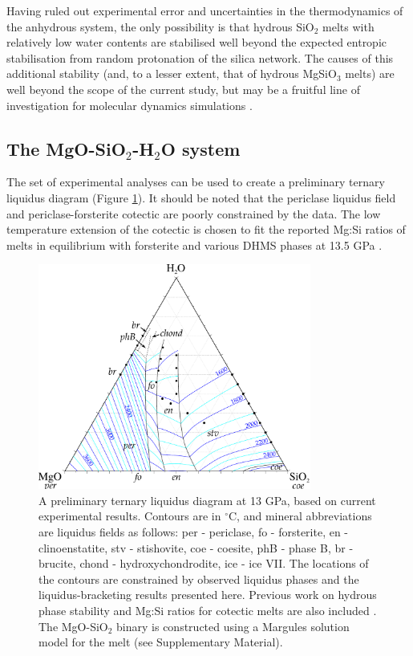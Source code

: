 \documentclass[review]{elsarticle}
\begin{document}
Having ruled out experimental error and uncertainties in the thermodynamics of the anhydrous system, the only possibility is that hydrous SiO$_2$ melts with relatively low water contents are stabilised well beyond the expected entropic stabilisation from random protonation of the silica network. The causes of this additional stability (and, to a lesser extent, that of hydrous MgSiO$_3$ melts) are well beyond the scope of the current study, but may be a fruitful line of investigation for molecular dynamics simulations \citep[e.g.][]{KS2010}.


\clearpage
\subsection{The MgO-SiO$_2$-H$_2$O system}
The set of experimental analyses can be used to create a preliminary ternary liquidus diagram (Figure \ref{fig:ternary}). It should be noted that the periclase liquidus field and periclase-forsterite cotectic are poorly constrained by the data. The low temperature extension of the cotectic is chosen to fit the reported Mg:Si ratios of melts in equilibrium with forsterite and various DHMS phases at 13.5 GPa \citep{MSUP2007}. 

 
\begin{figure}[ht!]
  \centering
      \includegraphics[width=0.8\textwidth]{figures/experimental-ternary}
  \caption{A preliminary ternary liquidus diagram at 13 GPa, based on current experimental results. Contours are in $^{\circ}$C, and mineral abbreviations are liquidus fields as follows: per - periclase, fo - forsterite, en - clinoenstatite, stv - stishovite, coe - coesite, phB - phase B, br - brucite, chond - hydroxychondrodite, ice - ice VII. The locations of the contours are constrained by observed liquidus phases and the liquidus-bracketing results presented here. Previous work on hydrous phase stability and Mg:Si ratios for cotectic melts are also included \citep{MSUP2007}. The MgO-SiO$_2$ binary is constructed using a Margules solution model for the melt (see Supplementary Material).}
  \label{fig:ternary}
\end{figure}
\end{document}
